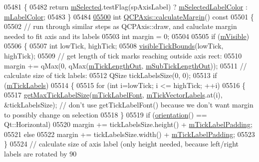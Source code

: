 \begin{DoxyCode}
05481 \textcolor{keyword}{}\{
05482   \textcolor{keywordflow}{return} \hyperlink{a00025_a08e1b62c634d80157f585206ebc30e37}{mSelected}.testFlag(spAxisLabel) ? \hyperlink{a00025_a94f57de3ba024471ca206d83cf2258dd}{mSelectedLabelColor} : 
      \hyperlink{a00025_a457a003bb1c2b6ab73e5a173ba7558fd}{mLabelColor};
05483 \}
05484 
\hypertarget{a00115_source_l05500}{}\hyperlink{a00025_a10756afda0cd419fb24d09adb411dda7}{05500} \textcolor{keywordtype}{int} \hyperlink{a00025_a10756afda0cd419fb24d09adb411dda7}{QCPAxis::calculateMargin}()\textcolor{keyword}{ const}
05501 \textcolor{keyword}{}\{
05502   \textcolor{comment}{// run through similar steps as QCPAxis::draw, and caluclate margin needed to fit axis and its labels}
05503   \textcolor{keywordtype}{int} margin = 0;
05504   
05505   \textcolor{keywordflow}{if} (\hyperlink{a00044_a62e3aed8427d6ce3ccf716f285106cb3}{mVisible})
05506   \{
05507     \textcolor{keywordtype}{int} lowTick, highTick;
05508     \hyperlink{a00025_a06320a944d1120732cc0d72fe1306d8b}{visibleTickBounds}(lowTick, highTick);
05509     \textcolor{comment}{// get length of tick marks reaching outside axis rect:}
05510     margin += qMax(0, qMax(\hyperlink{a00025_a2951f26d8a504d330157e05063513809}{mTickLengthOut}, \hyperlink{a00025_ae0342609ad543c2667673d75b43d9dbb}{mSubTickLengthOut}));
05511     \textcolor{comment}{// calculate size of tick labels:}
05512     QSize tickLabelsSize(0, 0);
05513     \textcolor{keywordflow}{if} (\hyperlink{a00025_a3e4315be072026644e69009557a2fa11}{mTickLabels})
05514     \{
05515       \textcolor{keywordflow}{for} (\textcolor{keywordtype}{int} i=lowTick; i <= highTick; ++i)
05516       \{
05517         \hyperlink{a00025_aca8025b82a43a4627eb87db9026a69c0}{getMaxTickLabelSize}(\hyperlink{a00025_add79d1e39c4ed65869a1e9cc79043f3f}{mTickLabelFont}, 
      \hyperlink{a00025_aeee4bd0fca3f587eafe33843d1cb4f82}{mTickVectorLabels}.at(i), &tickLabelsSize); \textcolor{comment}{// don't use getTickLabelFont() because we
       don't want margin to possibly change on selection}
05518       \}
05519       \textcolor{keywordflow}{if} (\hyperlink{a00025_a57483f2f60145ddc9e63f3af53959265}{orientation}() == Qt::Horizontal)
05520         margin += tickLabelsSize.height() + \hyperlink{a00025_ab3f2f5d923c83d952922149d0d1e2eb1}{mTickLabelPadding};
05521       \textcolor{keywordflow}{else}
05522         margin += tickLabelsSize.width() + \hyperlink{a00025_ab3f2f5d923c83d952922149d0d1e2eb1}{mTickLabelPadding};
05523     \}
05524     \textcolor{comment}{// calculate size of axis label (only height needed, because left/right labels are rotated by 90
}
\end{DoxyCode}
